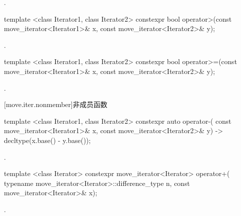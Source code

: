 \begin{itemdescr}
\pnum
\returns {}.
\end{itemdescr}

%
%
\begin{itemdecl}
template <class Iterator1, class Iterator2>
constexpr bool operator>(const move_iterator<Iterator1>& x, const move_iterator<Iterator2>& y);
\end{itemdecl}

\begin{itemdescr}
\pnum
\returns {}.
\end{itemdescr}

%
%
\begin{itemdecl}
template <class Iterator1, class Iterator2>
constexpr bool operator>=(const move_iterator<Iterator1>& x, const move_iterator<Iterator2>& y);
\end{itemdecl}

\begin{itemdescr}
\pnum
\returns {}.
\end{itemdescr}

[move.iter.nonmember]{非成员函数}

%
%
\begin{itemdecl}
template <class Iterator1, class Iterator2>
    constexpr auto operator-(
    const move_iterator<Iterator1>& x,
    const move_iterator<Iterator2>& y) -> decltype(x.base() - y.base());
\end{itemdecl}

\begin{itemdescr}
\pnum
\returns {}.
\end{itemdescr}

%
%
\begin{itemdecl}
template <class Iterator>
  constexpr move_iterator<Iterator> operator+(
    typename move_iterator<Iterator>::difference_type n, const move_iterator<Iterator>& x);
\end{itemdecl}

\begin{itemdescr}
\pnum
\returns {}.
\end{itemdescr}

